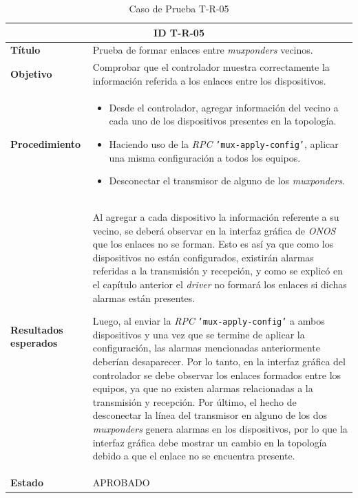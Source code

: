   \begin{table}[H]
    \centering
    \begin{tabular}{ |m{2.5cm}|m{11cm}|  }
    \hline
    \multicolumn{2}{|c|}{ \textbf{ID T-R-05} } \\
    \hline
    \centering
    \textbf{Título} & Prueba de formar enlaces entre \textit{muxponders} vecinos.  \\
    \hline
    \centering
    \textbf{Objetivo} & Comprobar que el controlador muestra correctamente la información referida a los enlaces entre los dispositivos.   \\
    \hline
    \centering
    \textbf{Procedimiento} & \begin{itemize}
      \item Desde el controlador, agregar información del vecino a cada uno de los dispositivos presentes en la topología.
      \item Haciendo uso de la \textit{RPC} \texttt{'mux-apply-config'}, aplicar una misma configuración a todos los equipos. 
      \item Desconectar el transmisor de alguno de los \textit{muxponders}.
    \end{itemize}     \\
    \hline
    \centering
    \textbf{Resultados esperados} & 
    Al agregar a cada dispositivo la información referente a su vecino, se deberá observar en la interfaz gráfica de \textit{ONOS} que los enlaces no se forman. Esto es así ya que como los dispositivos no están configurados, existirán alarmas referidas a la transmisión y recepción, y como se explicó en el capítulo anterior el \textit{driver} no formará los enlaces si dichas alarmas están presentes. 

Luego, al enviar la \textit{RPC} \texttt{'mux-apply-config'} a ambos dispositivos y una vez que se termine de aplicar la configuración, las alarmas mencionadas anteriormente deberían desaparecer. Por lo tanto, en la interfaz gráfica del controlador se debe observar los enlaces formados entre los equipos, ya que no existen alarmas relacionadas a la transmisión y recepción.
Por último, el hecho de desconectar la línea del transmisor en alguno de los dos \textit{muxponders} genera alarmas en los dispositivos, por lo que la interfaz gráfica debe mostrar un cambio en la topología debido a que el enlace no se encuentra presente.  
      \\
    
      \hline
    \centering
      \textbf{Estado}    & APROBADO  \\
    \hline
    \end{tabular}
    
    \caption{Caso de Prueba T-R-05}
    \label{tab:TR05}
    \end{table}

